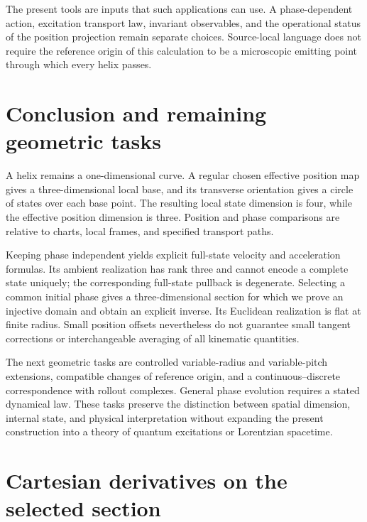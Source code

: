 \documentclass[11pt]{article}
\begin{document}
The present tools are inputs that such applications can use. A phase-dependent action, excitation transport law, invariant observables, and the operational status of the position projection remain separate choices. Source-local language does not require the reference origin of this calculation to be a microscopic emitting point through which every helix passes.

\section{Conclusion and remaining geometric tasks}

A helix remains a one-dimensional curve. A regular chosen effective position map gives a three-dimensional local base, and its transverse orientation gives a circle of states over each base point. The resulting local state dimension is four, while the effective position dimension is three. Position and phase comparisons are relative to charts, local frames, and specified transport paths.

Keeping phase independent yields explicit full-state velocity and acceleration formulas. Its ambient realization has rank three and cannot encode a complete state uniquely; the corresponding full-state pullback is degenerate. Selecting a common initial phase gives a three-dimensional section for which we prove an injective domain and obtain an explicit inverse. Its Euclidean realization is flat at finite radius. Small position offsets nevertheless do not guarantee small tangent corrections or interchangeable averaging of all kinematic quantities.

The next geometric tasks are controlled variable-radius and variable-pitch extensions, compatible changes of reference origin, and a continuous--discrete correspondence with rollout complexes. General phase evolution requires a stated dynamical law. These tasks preserve the distinction between spatial dimension, internal state, and physical interpretation without expanding the present construction into a theory of quantum excitations or Lorentzian spacetime.

\appendix
\section{Cartesian derivatives on the selected section}
\label{app:cartesian}
\end{document}
